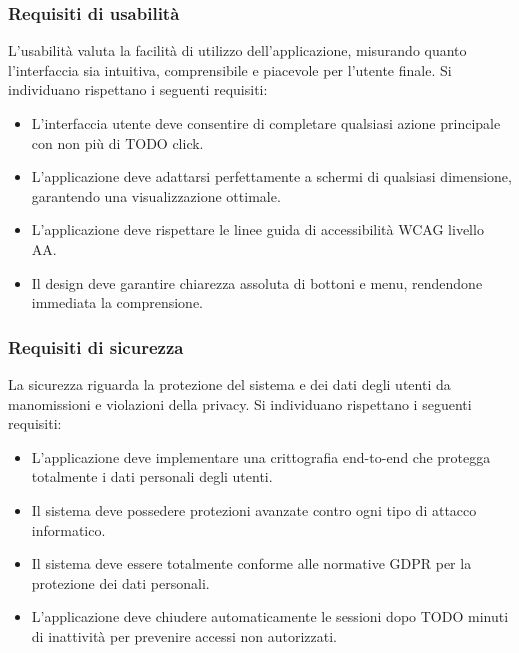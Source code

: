 \documentclass{book}
\begin{document}
\subsubsection{Requisiti di usabilità}
L'usabilità valuta la facilità di utilizzo dell'applicazione, misurando quanto l'interfaccia sia intuitiva, comprensibile e piacevole per l'utente finale. Si individuano rispettano i seguenti requisiti:
\begin{itemize}
    \item L'interfaccia utente deve consentire di completare qualsiasi azione principale con non più di TODO click.
    \item L'applicazione deve adattarsi perfettamente a schermi di qualsiasi dimensione, garantendo una visualizzazione ottimale.
    \item L'applicazione deve rispettare le linee guida di accessibilità WCAG livello AA\@.
    \item Il design deve garantire chiarezza assoluta di bottoni e menu, rendendone immediata la comprensione.
\end{itemize}

\subsubsection{Requisiti di sicurezza}
La sicurezza riguarda la protezione del sistema e dei dati degli utenti da manomissioni e violazioni della privacy. Si individuano rispettano i seguenti requisiti:
\begin{itemize}
    \item L'applicazione deve implementare una crittografia end-to-end che protegga totalmente i dati personali degli utenti.
    \item Il sistema deve possedere protezioni avanzate contro ogni tipo di attacco informatico.
    \item Il sistema deve essere totalmente conforme alle normative GDPR per la protezione dei dati personali.
    \item L'applicazione deve chiudere automaticamente le sessioni dopo TODO minuti di inattività per prevenire accessi non autorizzati.
\end{itemize}
\end{document}
